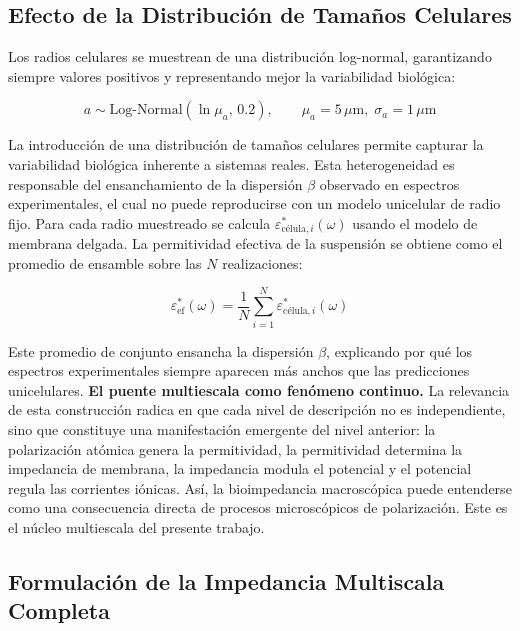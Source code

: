 \documentclass[12pt]{article}
\begin{document}
\subsection{Efecto de la Distribuci\'on de Tama\~{n}os Celulares}

Los radios celulares se muestrean de una distribuci\'on log-normal, garantizando siempre valores positivos y representando mejor la variabilidad biol\'ogica:

\begin{equation}
a \sim \mathrm{Log\text{-}Normal}(\ln\mu_a,\,0.2), \qquad \mu_a = 5\,\mu\text{m},\;
\sigma_a = 1\,\mu\text{m}
\end{equation}

La introducci\'on de una distribuci\'on de tama\~{n}os celulares permite capturar
la variabilidad biol\'ogica inherente a sistemas reales. Esta heterogeneidad es
responsable del ensanchamiento de la dispersi\'on $\beta$ observado en espectros
experimentales, el cual no puede reproducirse con un modelo unicelular de radio
fijo. Para cada radio muestreado se calcula $\varepsilon_{\text{c\'elula},i}^*(\omega)$
usando el modelo de membrana delgada. La permitividad efectiva de la suspensi\'on
se obtiene como el promedio de ensamble sobre las $N$ realizaciones:

\begin{equation}
\varepsilon_{\text{ef}}^*(\omega) =
\frac{1}{N}\sum_{i=1}^{N}\varepsilon_{\text{c\'elula},i}^*(\omega)
\end{equation}

Este promedio de conjunto ensancha la dispersi\'on $\beta$, explicando por qu\'e los espectros
experimentales siempre aparecen m\'as anchos que las predicciones unicelulares.
\noindent\textbf{El puente multiescala como fen\'omeno continuo.}
La relevancia de esta construcci\'on radica en que cada nivel de descripci\'on no es
independiente, sino que constituye una manifestaci\'on emergente del nivel anterior:
la polarizaci\'on at\'omica genera la permitividad, la permitividad determina la
impedancia de membrana, la impedancia modula el potencial y el potencial regula las
corrientes i\'onicas. As\'i, la bioimpedancia macrosc\'opica puede entenderse como una
consecuencia directa de procesos microsc\'opicos de polarizaci\'on. Este es el n\'ucleo
multiescala del presente trabajo.

\subsection{Formulaci\'on de la Impedancia Multiscala Completa}
\end{document}
